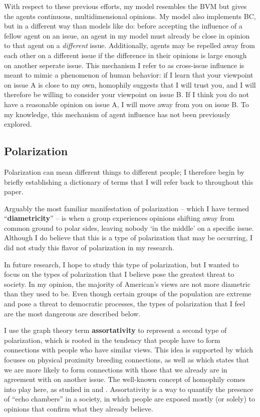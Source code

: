 With respect to these previous efforts, my model resembles the BVM but gives
the agents continuous, multidimensional opinions. My model also implements BC, but in
a different way than models like \cite{tsang_opinion_2014} do: before accepting
the influence of a fellow agent on an issue, an agent in my model must already
be close in opinion to that agent on a \textit{different} issue. Additionally, agents may be repelled away from each other on a different issue if the difference in their opinions is large enough on another seperate issue. This mechanism I refer to as  
cross-issue influence is meant to mimic a phenomenon of human behavior: if I learn that your viewpoint on
issue A is close to my own, homophily suggests that I will trust you, and I
will therefore be willing to consider your viewpoint on issue B. If I think you do not have a reasonable opinion on issue A, I will move away from you on issue B. To my
knowledge, this mechanism of agent influence has not been previously explored.

\subsection{Polarization}

Polarization can mean different things to different people; I therefore begin
by briefly establishing a dictionary of terms that I will refer back to
throughout this paper.

Arguably the most familiar manifestation of polarization -- which I have termed
``\textbf{diametricity}'' -- is when a group experiences opinions shifting away
from common ground to polar sides, leaving nobody `in the middle' on a specific
issue. Although I do believe that this is a type of polarization that may be occurring, I did not study this flavor of polarization in my research. 

In future research, I hope to study this type of polarization, but I wanted to focus on the types of polarization that I believe pose the greatest threat to society. In my opinion, the majority of American's views are not more diametric than they used to be. Even though certain groups of the population are extreme and pose a threat to democratic processes, the types of polarization that I feel are the most dangerous are described below. 

I use the graph theory term \textbf{assortativity} to represent a second type
of polarization, which is rooted in the tendency that people have to form
connections with people who have similar views. This idea is supported by
\cite{klinkner_red_2005} which focuses on physical proximity breeding
connections, as well as \cite{cholvy_diffusion_2016} which states that we are
more likely to form connections with those that we already are in agreement
with on another issue. The well-known concept of homophily comes into play
here, as studied in \cite{davies_twin_2017} and \cite{taylor_exploring_2018}.
Assortativity is a way to quantify the presence of ``echo chambers'' in a
society, in which people are exposed mostly (or solely) to opinions that
confirm what they already
believe.\cite{dandekar_biased_2013,flaxman_filter_2016}

